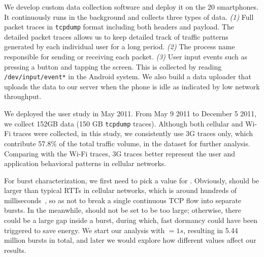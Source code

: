We develop custom data collection software and deploy it on the 20 smartphones. It continuously runs in the background and collects three types of data. {\em (1)} Full packet traces in \texttt{tcpdump} format including both headers and payload. The detailed packet traces allows us to keep detailed track of traffic patterns generated by each individual user for a long period. {\em (2)} The process name responsible for sending or receiving each packet.
{\em (3)} User input events such as pressing a button and tapping the screen. This is collected by reading \texttt{/dev/input/event*} in the Android system.
We also build a data uploader that uploads the data to our server when the phone is idle as indicated by low network throughput.

We deployed the user study in May 2011. From May 9 2011 to December 5 2011, we collect 152GB data (150 GB \texttt{tcpdump} traces). Although both cellular and Wi-Fi traces were collected, in this study, we consistently use 3G traces only, which contribute 57.8\% of the total traffic volume, in the \UMICH dataset for further analysis. Comparing with the Wi-Fi traces, 3G traces better represent the user and application behavioral patterns in cellular networks.


For burst characterization, we first need to pick a value for \BT. Obviously, \BT should be larger than typical RTTs in cellular networks, which is around hundreds of milliseconds~\cite{mobisys.3gtest, huang_mobisys12}, so as not to break a single continuous TCP flow into separate bursts. In the meanwhile, \BT should not be set to be too large; otherwise, there could be a large gap inside a burst, during which, fast dormancy could have been triggered to save energy. We start our analysis with \BT $= 1s$, resulting in 5.44 million bursts in total, and later we would explore how different \BT values affect our results.

